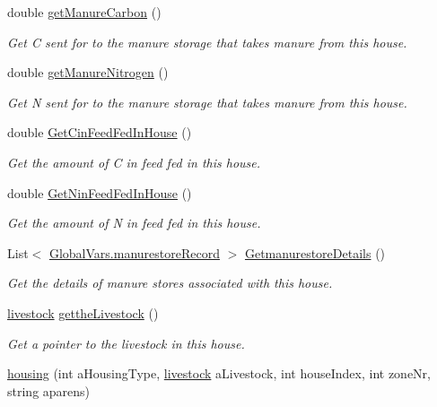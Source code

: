 \begin{DoxyCompactItemize}
double \mbox{\hyperlink{classhousing_aa1b989203ae13ab9cc37388e86039857}{get\+Manure\+Carbon}} ()
\begin{DoxyCompactList}\small\item\em Get C sent for to the manure storage that takes manure from this house. \end{DoxyCompactList}\item 
double \mbox{\hyperlink{classhousing_aa33ebd3c77c96f5b100769c79dc88ecb}{get\+Manure\+Nitrogen}} ()
\begin{DoxyCompactList}\small\item\em Get N sent for to the manure storage that takes manure from this house. \end{DoxyCompactList}\item 
double \mbox{\hyperlink{classhousing_aa7dc2d7cb586625504b95939abb32748}{Get\+Cin\+Feed\+Fed\+In\+House}} ()
\begin{DoxyCompactList}\small\item\em Get the amount of C in feed fed in this house. \end{DoxyCompactList}\item 
double \mbox{\hyperlink{classhousing_af8d0876ee58aa70abc1177d6696a702f}{Get\+Nin\+Feed\+Fed\+In\+House}} ()
\begin{DoxyCompactList}\small\item\em Get the amount of N in feed fed in this house. \end{DoxyCompactList}\item 
List$<$ \mbox{\hyperlink{struct_global_vars_1_1manurestore_record}{Global\+Vars.\+manurestore\+Record}} $>$ \mbox{\hyperlink{classhousing_a470209947b645d13f08b36e81b376c83}{Getmanurestore\+Details}} ()
\begin{DoxyCompactList}\small\item\em Get the details of manure stores associated with this house. \end{DoxyCompactList}\item 
\mbox{\hyperlink{classlivestock}{livestock}} \mbox{\hyperlink{classhousing_ac8e88d4ccf32bc6f9a4fad60a35cd0ae}{getthe\+Livestock}} ()
\begin{DoxyCompactList}\small\item\em Get a pointer to the livestock in this house. \end{DoxyCompactList}\item 
\mbox{\hyperlink{classhousing_a3d182603aa608799e0d97c5a1bcb97bd}{housing}} (int a\+Housing\+Type, \mbox{\hyperlink{classlivestock}{livestock}} a\+Livestock, int house\+Index, int zone\+Nr, string aparens)

\end{DoxyCompactItemize}
